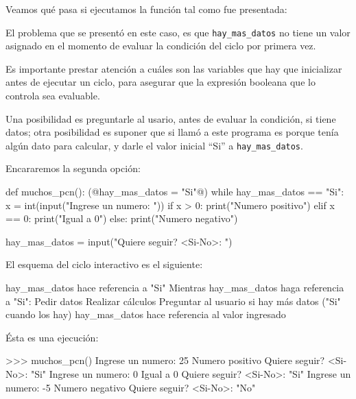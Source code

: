 Veamos qué pasa si ejecutamos la función tal como fue presentada:


El problema que se presentó en este caso, es que \lstinline!hay_mas_datos! no
tiene un valor asignado en el momento de evaluar la condición del ciclo por
primera vez.

\begin{observacion}
Es importante prestar atención a cuáles son las variables que hay que
inicializar antes de ejecutar un ciclo, para asegurar que la expresión
booleana que lo controla sea evaluable.
\end{observacion}

Una posibilidad es preguntarle al usario, antes de evaluar la condición, si
tiene datos; otra posibilidad es suponer que si llamó a este programa es porque
tenía algún dato para calcular, y darle el valor inicial ``Si'' a
\lstinline!hay_mas_datos!.

Encararemos la segunda opción:

\begin{codigo-python-sn}
def muchos_pcn():
    (@hay_mas_datos = "Si"@)
    while hay_mas_datos == "Si":
        x = int(input("Ingrese un numero: "))
        if x > 0:
            print("Numero positivo")
        elif x == 0:
            print("Igual a 0")
        else:
            print("Numero negativo")

        hay_mas_datos = input("Quiere seguir? <Si-No>: ")
\end{codigo-python-sn}

El esquema del ciclo interactivo es el siguiente:

\begin{codigo-nohl-sn}
hay_mas_datos hace referencia a "Si"
Mientras hay_mas_datos haga referencia a "Si":
    Pedir datos
    Realizar cálculos
    Preguntar al usuario si hay más datos ("Si" cuando los hay)
    hay_mas_datos hace referencia al valor ingresado
\end{codigo-nohl-sn}

Ésta es una ejecución:

\begin{codigo-python-sn}
>>> muchos_pcn()
Ingrese un numero: 25
Numero positivo
Quiere seguir? <Si-No>: "Si"
Ingrese un numero: 0
Igual a 0
Quiere seguir? <Si-No>: "Si"
Ingrese un numero: -5
Numero negativo
Quiere seguir? <Si-No>: "No"
\end{codigo-python-sn}

